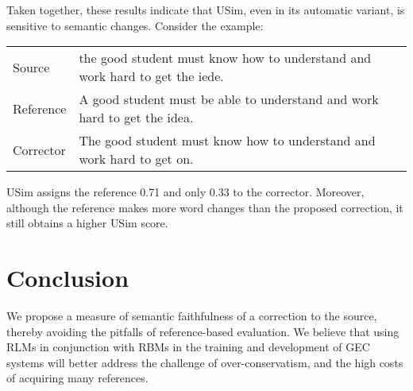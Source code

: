 \documentclass[a4paper, 11pt]{article}
\begin{document}
Taken together, these results indicate that {\sc USim}, even in its automatic variant,
is sensitive to semantic changes. Consider the example: 

\begin{table}[h!]
  \centering
  \label{ex:sensitive}
  \begin{tabular}{p{}p{}}
    Source    & \small the good student must know how to understand and work hard to get the iede.\\
    Reference & \small A good student must be able to understand and work hard to get the idea.\\
    Corrector & \small The good student must know how to understand and work hard to get on.     
  \end{tabular}
  
\end{table}

{\sc USim} assigns the reference 0.71 and only 0.33 to the corrector.
Moreover, although the reference makes more word changes than the proposed correction,
it still obtains a higher {\sc USim} score.


%
%
%

\section{Conclusion}

We propose a measure of semantic faithfulness of a correction to the source,
thereby avoiding the pitfalls of reference-based evaluation. 
We believe that using RLMs in conjunction with RBMs in the training and development of GEC
systems will better address the challenge of over-conservatism, and the 
high costs of acquiring many references.
\end{document}
